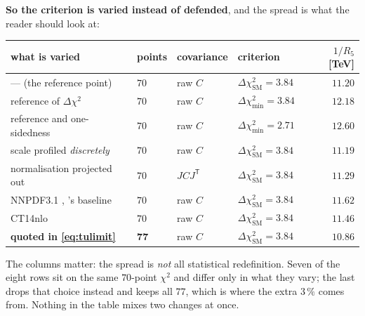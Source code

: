 \documentclass[11pt,a4paper]{article}
\begin{document}
\noindent\textbf{So the criterion is varied instead of defended}, and the spread is what the reader
should look at:
\begin{center}\small
{}
\begin{tabular}{llll r}
\toprule
\rowcolor{hdrblue!10}what is varied & points & covariance & criterion & $1/R_5$ [TeV]\\
\midrule
--- (the reference point) & $70$ & raw $C$ & $\Delta\chi^2_{\mathrm{SM}}=3.84$ & $11.20$\\
reference of $\Delta\chi^2$ & $70$ & raw $C$ & $\Delta\chi^2_{\min}=3.84$ & $12.18$\\
reference and one-sidedness & $70$ & raw $C$ & $\Delta\chi^2_{\min}=2.71$ & $12.60$\\
scale profiled \emph{discretely} & $70$ & raw $C$ & $\Delta\chi^2_{\mathrm{SM}}=3.84$ & $11.19$\\
normalisation projected out & $70$ & $JCJ^{\mathsf T}$ & $\Delta\chi^2_{\mathrm{SM}}=3.84$ & $11.29$\\
NNPDF3.1 \cite{NNPDF31}, \cite{CMSangular}'s baseline & $70$ & raw $C$ & $\Delta\chi^2_{\mathrm{SM}}=3.84$ & $11.62$\\
CT14nlo \cite{CT14} & $70$ & raw $C$ & $\Delta\chi^2_{\mathrm{SM}}=3.84$ & $11.46$\\
\midrule
\textbf{quoted in \eqref{eq:tulimit}} & $\mathbf{77}$ & raw $C$ & $\Delta\chi^2_{\mathrm{SM}}=3.84$ & $\mathbf{10.86}$\\
\bottomrule
\end{tabular}
\end{center}
\noindent The columns matter: the spread is \emph{not} all statistical redefinition. Seven of the
eight rows sit on the same $70$-point $\chi^2$ and differ only in what they vary; the last drops
that choice instead and keeps all $77$, which is where the extra $3\,\%$ comes from. Nothing in the table mixes two changes at once.
\end{document}
